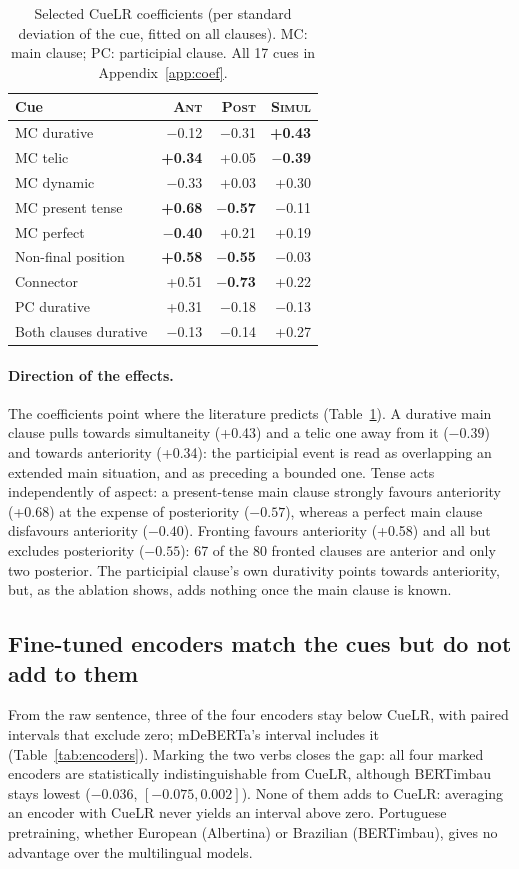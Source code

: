 \documentclass[11pt]{article}
\begin{document}
\begin{table}[t]
\centering\small
\setlength{\tabcolsep}{4pt}
\begin{tabular}{lrrr}
\toprule
Cue & \textsc{Ant} & \textsc{Post} & \textsc{Simul} \\
\midrule
MC durative & $-$0.12 & $-$0.31 & \textbf{+0.43} \\
MC telic & \textbf{+0.34} & +0.05 & \textbf{$-$0.39} \\
MC dynamic & $-$0.33 & +0.03 & +0.30 \\
MC present tense & \textbf{+0.68} & \textbf{$-$0.57} & $-$0.11 \\
MC perfect & \textbf{$-$0.40} & +0.21 & +0.19 \\
Non-final position & \textbf{+0.58} & \textbf{$-$0.55} & $-$0.03 \\
Connector & +0.51 & \textbf{$-$0.73} & +0.22 \\
PC durative & +0.31 & $-$0.18 & $-$0.13 \\
Both clauses durative & $-$0.13 & $-$0.14 & +0.27 \\
\bottomrule
\end{tabular}
\caption{Selected CueLR coefficients (per standard deviation of the cue, fitted on all clauses). MC: main clause; PC: participial clause. All 17 cues in Appendix~\ref{app:coef}.}
\label{tab:coef}
\end{table}

\paragraph{Direction of the effects.} The coefficients point where the literature predicts (Table~\ref{tab:coef}). A durative main clause pulls towards simultaneity (+0.43) and a telic one away from it ($-0.39$) and towards anteriority (+0.34): the participial event is read as overlapping an extended main situation, and as preceding a bounded one. Tense acts independently of aspect: a present-tense main clause strongly favours anteriority (+0.68) at the expense of posteriority ($-0.57$), whereas a perfect main clause disfavours anteriority ($-0.40$). Fronting favours anteriority (+0.58) and all but excludes posteriority ($-0.55$): 67 of the 80 fronted clauses are anterior and only two posterior. The participial clause's own durativity points towards anteriority, but, as the ablation shows, adds nothing once the main clause is known.

\subsection{Fine-tuned encoders match the cues but do not add to them}
\label{sec:encoders}
From the raw sentence, three of the four encoders stay below CueLR, with paired intervals that exclude zero; mDeBERTa's interval includes it (Table~\ref{tab:encoders}). Marking the two verbs closes the gap: all four marked encoders are statistically indistinguishable from CueLR, although BERTimbau stays lowest ($-0.036$, $[-0.075, 0.002]$). None of them adds to CueLR: averaging an encoder with CueLR never yields an interval above zero. Portuguese pretraining, whether European (Albertina) or Brazilian (BERTimbau), gives no advantage over the multilingual models.
\end{document}
